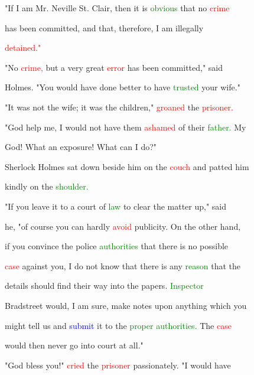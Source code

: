  "If I am Mr. Neville St. Clair, then it is \textcolor{green}{obvious} that no \textcolor{red}{crime}

 has been committed, and that, therefore, I am illegally

 \textcolor{red}{detained."}



 "No \textcolor{red}{crime,} but a very great \textcolor{red}{error} has been committed," said

 Holmes. "You would have done better to have \textcolor{green}{trusted} your wife."



 "It was not the wife; it was the \textcolor{BurntOrange}{children,"} \textcolor{red}{groaned} the \textcolor{red}{prisoner.}

 \textcolor{BurntOrange}{"God} help me, I would not have them \textcolor{red}{ashamed} of their \textcolor{green}{father.} My

 \textcolor{BurntOrange}{God!} What an exposure! What can I do?"



 Sherlock Holmes sat down beside him on the \textcolor{red}{couch} and patted him

 kindly on the \textcolor{green}{shoulder.}



 "If you \textcolor{BurntOrange}{leave} it to a \textcolor{BurntOrange}{court} of \textcolor{green}{law} to clear the matter up," said

 he, "of course you can hardly \textcolor{red}{avoid} publicity. On the other hand,

 if you \textcolor{BurntOrange}{convince} the \textcolor{BurntOrange}{police} \textcolor{green}{authorities} that there is no possible

 \textcolor{red}{case} against you, I do not know that there is any \textcolor{green}{reason} that the

 details should find their way into the papers. \textcolor{green}{Inspector}

 Bradstreet would, I am sure, make notes upon anything which you

 might tell us and \textcolor{blue}{submit} it to the \textcolor{green}{proper} \textcolor{green}{authorities.} The \textcolor{red}{case}

 would then never go into \textcolor{BurntOrange}{court} at all."



 \textcolor{BurntOrange}{"God} \textcolor{BurntOrange}{bless} you!" \textcolor{red}{cried} the \textcolor{red}{prisoner} passionately. "I would have

